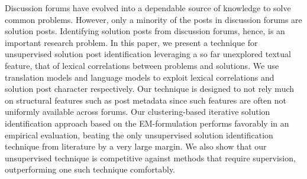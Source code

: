 Discussion forums have evolved into a dependable source of knowledge to solve common problems. However, only a minority of the posts in discussion forums are solution posts. Identifying solution posts from discussion forums, hence, is an important research problem. In this paper, we present a technique for unsupervised solution post identification leveraging a so far unexplored textual feature, that of lexical correlations between problems and solutions. We use translation models and language models to exploit lexical correlations and solution post character respectively. Our technique is designed to not rely much on structural features such as post metadata since such features are often not uniformly available across forums. Our clustering-based iterative solution identification approach based on the EM-formulation performs favorably in an empirical evaluation, beating the only unsupervised solution identification technique from literature by a very large margin. We also show that our unsupervised technique is competitive against methods that require supervision, outperforming one such technique comfortably.
